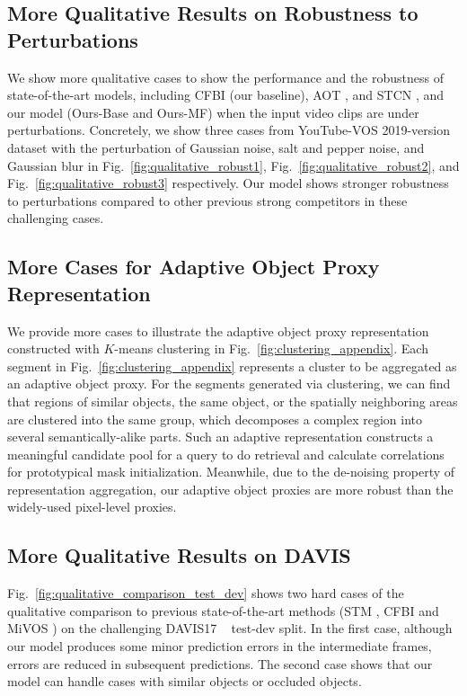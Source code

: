 \documentclass[sigconf]{acmart}
\begin{document}
\subsection{More Qualitative Results on Robustness to Perturbations}
We show more qualitative cases to show the performance and the robustness of state-of-the-art models, including CFBI \cite{yang2020collaborative} (our baseline), AOT \cite{yang2021associating}, and STCN \cite{cheng2021rethinking}, and our model (Ours-Base and Ours-MF) when the input video clips are under perturbations. Concretely, we show three cases from YouTube-VOS \cite{xu2018youtube} 2019-version dataset with the perturbation of Gaussian noise, salt and pepper noise, and Gaussian blur in Fig.~\ref{fig:qualitative_robust1}, Fig.~\ref{fig:qualitative_robust2}, and Fig.~\ref{fig:qualitative_robust3} respectively. Our model shows stronger robustness to perturbations compared to other previous strong competitors in these challenging cases.

\subsection{More Cases for Adaptive Object Proxy Representation}
We provide more cases to illustrate the adaptive object proxy representation constructed with $K$-means clustering in Fig.~\ref{fig:clustering_appendix}. Each segment in Fig.~\ref{fig:clustering_appendix} represents a cluster to be aggregated as an adaptive object proxy. For the segments generated via clustering, we can find that regions of similar objects, the same object, or the spatially neighboring areas are clustered into the same group, which decomposes a complex region into several semantically-alike parts. Such an adaptive representation constructs a meaningful candidate pool for a query to do retrieval and calculate correlations for prototypical mask initialization. Meanwhile, due to the de-noising property of representation aggregation, our adaptive object proxies are more robust than the widely-used pixel-level proxies. 




\subsection{More Qualitative Results on DAVIS}
Fig.~\ref{fig:qualitative_comparison_test_dev} shows two hard cases of the 
    qualitative comparison to previous state-of-the-art methods (STM \cite{oh2019video}, CFBI \cite{yang2020collaborative} and MiVOS \cite{cheng2021modular}) on the challenging DAVIS17 ~\cite{ponttuset20182017} test-dev split. In the first case, although our model produces some minor prediction errors in the intermediate frames, errors are reduced in subsequent predictions. The second case shows that our model can handle cases with similar objects or occluded objects.
        
\end{document}
